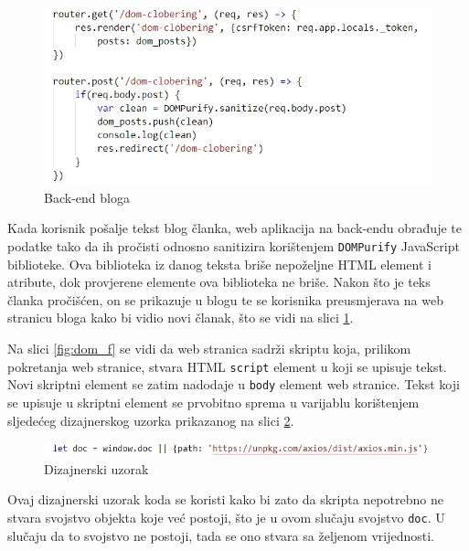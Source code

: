 \documentclass[12pt, oneside, onecolumn]{book}
\begin{document}
{\begin{figure}[H]
	\begin{center}
		\includegraphics[width=\textwidth]{dom_b.jpg}
		\caption{Back-end bloga} \label{fig:dom_b}
	\end{center}
\end{figure}

Kada korisnik pošalje tekst blog članka, web aplikacija na back-endu obrađuje te podatke tako da ih pročisti odnosno sanitizira korištenjem \texttt{DOMPurify} JavaScript biblioteke. Ova biblioteka iz danog teksta briše nepoželjne HTML element i atribute, dok provjerene elemente ova biblioteka ne briše. Nakon što je teks članka pročišćen, on se prikazuje u blogu te se korisnika preusmjerava na web stranicu bloga kako bi vidio novi članak, što se vidi na slici \ref{fig:dom_b}.

Na slici \ref{fig:dom_f} se vidi da web stranica sadrži skriptu koja, prilikom pokretanja web stranice, stvara HTML \texttt{script} element u koji se upisuje tekst. Novi skriptni element se zatim nadodaje u \texttt{body} element web stranice. Tekst koji se upisuje u skriptni element se prvobitno sprema u varijablu korištenjem sljedećeg dizajnerskog uzorka prikazanog na slici \ref{fig:dom_pat}.

\begin{figure}[H]
	\begin{center}
		\includegraphics[width=\textwidth]{dom_pat.jpg}
		\caption{Dizajnerski uzorak} \label{fig:dom_pat}
	\end{center}
\end{figure}

Ovaj dizajnerski uzorak koda se koristi kako bi zato da skripta nepotrebno ne stvara svojstvo objekta koje već postoji, što je u ovom slučaju svojstvo \texttt{doc}. U slučaju da to svojstvo ne postoji, tada se ono stvara sa željenom vrijednosti.

}
\end{document}
